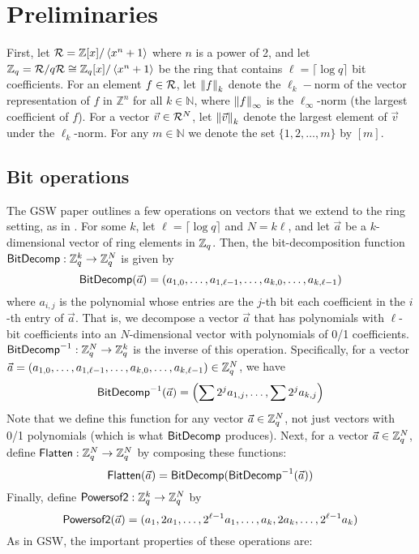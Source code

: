 \section{Preliminaries}

First, let $\R = \mathbb{Z}[x] / \left<x^n + 1\right>$ where $n$ is a power of 2, and let $\Zq = \R/q\R \cong \mathbb{Z}_q[x] / \left<x^n + 1\right> $ be the ring that contains $\ell = \lceil\log q\rceil$ bit coefficients.  For an element $f \in \R$, let $\norm{k}{f}$ denote the $\ell_k-$norm of the vector representation of $f$ in $\mathbb{Z}^n$ for all $k \in \mathbb{N}$, where $\norm{\infty}{f}$ is the $\ell_\infty$-norm (the largest coefficient of $f$).  For a vector $\vec{v} \in \R^N$, let $\norm{k}{\vec{v}}$ denote the largest element of $\vec{v}$ under the $\ell_k$-norm. For any $m \in \mathbb{N}$ we denote the set $\{1,2,\ldots,m\}$ by $[m]$.

\subsection{Bit operations}

The GSW paper outlines a few operations on vectors that we extend to the ring setting, as in \cite{shield}.  For some $k$, let $\ell = \lceil \log q \rceil$ and $N = k\ell$, and let $\vec{a}$ be a $k$-dimensional vector of ring elements in $\Zq$.  Then, the bit-decomposition function $\bdfn: \Zq^k \to \Zq^N$ is given by $$\bdfn(\vec{a}) = (a_{1,0}, \ldots, a_{1, \ell-1}, \ldots, a_{k, 0}, \ldots, a_{k, \ell-1})$$ where $a_{i,j}$ is the polynomial whose entries are the $j$-th bit each coefficient in the $i$-th entry of $\vec{a}$.  That is, we decompose a vector $\vec{a}$ that has polynomials with $\ell$-bit coefficients into an $N$-dimensional vector with polynomials of 0/1 coefficients.  $\bdifn: \Zq^N \to \Zq^k$ is the inverse of this operation.  Specifically, for a vector $\vec{a} = (a_{1,0}, \ldots, a_{1, \ell-1}, \ldots, a_{k, 0}, \ldots, a_{k, \ell-1}) \in \Zq^N$, we have $$\bdifn(\vec{a}) = \left(\sum 2^j a_{1,j}, \ldots, \sum 2^j a_{k, j}\right)$$  Note that we define this function for any vector $\vec{a} \in \Zq^N$, not just vectors with 0/1 polynomials (which is what $\bdfn$ produces).  Next, for a vector $\vec{a} \in \Zq^N$, define $\flattenfn: \Zq^N \to \Zq^N$ by composing these functions: $$\flattenfn(\vec{a}) = \bdfn(\bdifn(\vec{a}))$$  Finally, define $\powfn: \Zq^k \to \Zq^N$ by $$\powfn(\vec{a}) = (a_1, 2a_1, \ldots, 2^{\ell-1}a_1, \ldots, a_k, 2a_k, \ldots, 2^{\ell-1}a_k)$$  As in GSW, the important properties of these operations are:

